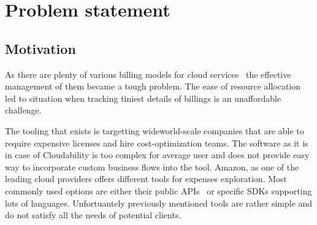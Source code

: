 \documentclass[licencjacka,en]{thesisclass}
\begin{document}

    \chapter{Problem statement}

    \section{Motivation}

    As there are plenty of various billing models for cloud services~\cite{GLaatikainen}
    the effective management of them became a tough problem.
    The ease of resource allocation led to situation when tracking tiniest details of billings is an unaffordable challenge.

    The tooling that exists is targetting wideworld-scale companies that are able to require expensive licenses and hire cost-optimization teams.
    The software as it is in case of Cloudability is too complex for average user and does not provide easy way to incorporate custom business flows into the tool.
    Amazon, as one of the leading cloud providers offers different tools for expenses exploration. Most commonly used options are either their public APIs~\cite{AWSCostManagement} or specific SDKs supporting lots of languages.
    Unfortuantely previously mentioned tools are rather simple and do not satisfy all the needs of potential clients.
\end{document}
